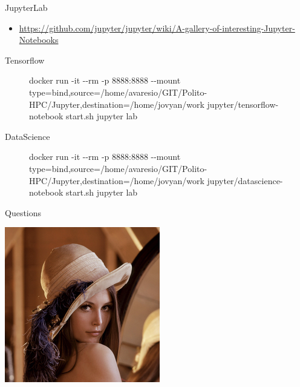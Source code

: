\documentclass[ignorenonframetext,]{beamer}
\providecommand{\tightlist}{%
  \setlength{\itemsep}{0pt}\setlength{\parskip}{0pt}}
\begin{document}
\begin{frame}{JupyterLab}

\begin{itemize}
\tightlist
\item
  \url{https://github.com/jupyter/jupyter/wiki/A-gallery-of-interesting-Jupyter-Notebooks}
\end{itemize}


\begin{description}
\item[Tensorflow]
docker run -it -\/-rm -p 8888:8888 -\/-mount
type=bind,source=/home/avaresio/GIT/Polito-HPC/Jupyter,destination=/home/jovyan/work
jupyter/tensorflow-notebook start.sh jupyter lab
\item[DataScience]
docker run -it -\/-rm -p 8888:8888 -\/-mount
type=bind,source=/home/avaresio/GIT/Polito-HPC/Jupyter,destination=/home/jovyan/work
jupyter/datascience-notebook start.sh jupyter lab
\end{description}


\end{frame}

\begin{frame}{Questions}

\includegraphics{images/Lenna.png}

\end{frame}
\end{document}
